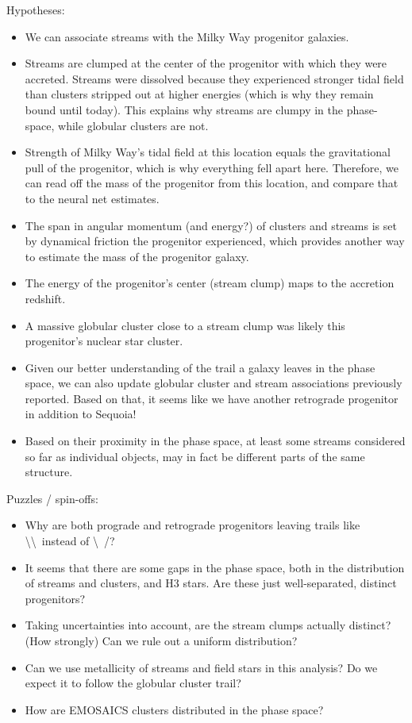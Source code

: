 \documentclass[twocolumn]{aastex63}
\begin{document}
Hypotheses:
\begin{itemize}
\item{We can associate streams with the Milky Way progenitor galaxies.}
\item{Streams are clumped at the center of the progenitor with which they were accreted. Streams were dissolved because they experienced stronger tidal field than clusters stripped out at higher energies (which is why they remain bound until today). This explains why streams are clumpy in the phase-space, while globular clusters are not.}
\item{Strength of Milky Way's tidal field at this location equals the gravitational pull of the progenitor, which is why everything fell apart here. Therefore, we can read off the mass of the progenitor from this location, and compare that to the neural net estimates.}
\item{The span in angular momentum (and energy?) of clusters and streams is set by dynamical friction the progenitor experienced, which provides another way to estimate the mass of the progenitor galaxy.}
\item{The energy of the progenitor's center (stream clump) maps to the accretion redshift.}
\item{A massive globular cluster close to a stream clump was likely this progenitor's nuclear star cluster.}
\item{Given our better understanding of the trail a galaxy leaves in the phase space, we can also update globular cluster and stream associations previously reported. Based on that, it seems like we have another retrograde progenitor in addition to Sequoia!}
\item{Based on their proximity in the phase space, at least some streams considered so far as individual objects, may in fact be different parts of the same structure.}
\end{itemize}

Puzzles / spin-offs:
\begin{itemize}
\item{Why are both prograde and retrograde progenitors leaving trails like \textbackslash \textbackslash\ instead of \textbackslash\ /?}
\item{It seems that there are some gaps in the phase space, both in the distribution of streams and clusters, and H3 stars. Are these just well-separated, distinct progenitors?}
\item{Taking uncertainties into account, are the stream clumps actually distinct? (How strongly) Can we rule out a uniform distribution?}
\item{Can we use metallicity of streams and field stars in this analysis? Do we expect it to follow the globular cluster trail?}
\item{How are EMOSAICS clusters distributed in the phase space?}
\end{itemize}
\end{document}
